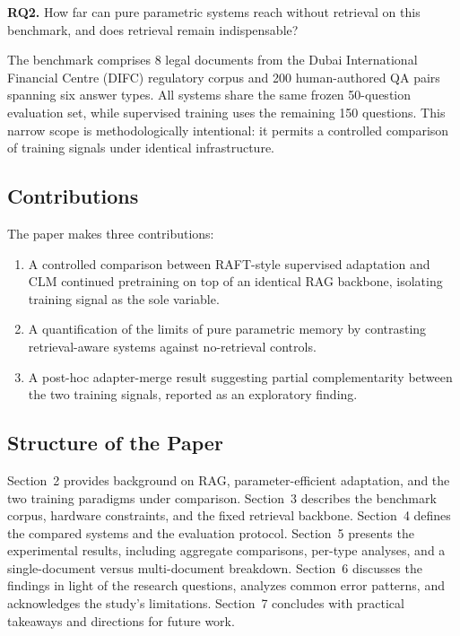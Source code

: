 \textbf{RQ2.} How far can pure parametric systems reach without retrieval on this benchmark, and does retrieval remain indispensable?

The benchmark comprises 8 legal documents from the Dubai International Financial Centre (DIFC) regulatory corpus and 200 human-authored QA pairs spanning six answer types. All systems share the same frozen 50-question evaluation set, while supervised training uses the remaining 150 questions. This narrow scope is methodologically intentional: it permits a controlled comparison of training signals under identical infrastructure.

\subsection{Contributions}

The paper makes three contributions:

\begin{enumerate}
    \item A controlled comparison between RAFT-style supervised adaptation and CLM continued pretraining on top of an identical RAG backbone, isolating training signal as the sole variable.
    \item A quantification of the limits of pure parametric memory by contrasting retrieval-aware systems against no-retrieval controls.
    \item A post-hoc adapter-merge result suggesting partial complementarity between the two training signals, reported as an exploratory finding.
\end{enumerate}

\subsection{Structure of the Paper}

Section~2 provides background on RAG, parameter-efficient adaptation, and the two training paradigms under comparison. Section~3 describes the benchmark corpus, hardware constraints, and the fixed retrieval backbone. Section~4 defines the compared systems and the evaluation protocol. Section~5 presents the experimental results, including aggregate comparisons, per-type analyses, and a single-document versus multi-document breakdown. Section~6 discusses the findings in light of the research questions, analyzes common error patterns, and acknowledges the study's limitations. Section~7 concludes with practical takeaways and directions for future work.

